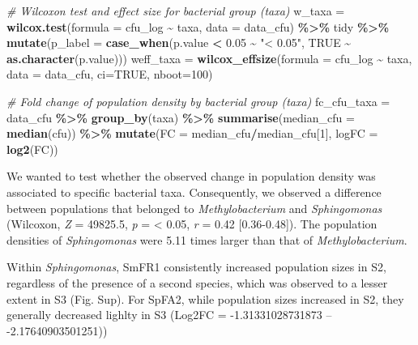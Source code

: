 \documentclass[
]{article}
\newenvironment{Shaded}{\begin{snugshade}}{\end{snugshade}}
\newcommand{\AttributeTok}[1]{\textcolor[rgb]{0.13,0.29,0.53}{#1}}
\newcommand{\CommentTok}[1]{\textcolor[rgb]{0.56,0.35,0.01}{\textit{#1}}}
\newcommand{\ConstantTok}[1]{\textcolor[rgb]{0.56,0.35,0.01}{#1}}
\newcommand{\DecValTok}[1]{\textcolor[rgb]{0.00,0.00,0.81}{#1}}
\newcommand{\FloatTok}[1]{\textcolor[rgb]{0.00,0.00,0.81}{#1}}
\newcommand{\FunctionTok}[1]{\textcolor[rgb]{0.13,0.29,0.53}{\textbf{#1}}}
\newcommand{\NormalTok}[1]{#1}
\newcommand{\OtherTok}[1]{\textcolor[rgb]{0.56,0.35,0.01}{#1}}
\newcommand{\SpecialCharTok}[1]{\textcolor[rgb]{0.81,0.36,0.00}{\textbf{#1}}}
\newcommand{\StringTok}[1]{\textcolor[rgb]{0.31,0.60,0.02}{#1}}
\begin{document}
\begin{Shaded}
\begin{Highlighting}[]
\CommentTok{\# Wilcoxon test and effect size for bacterial group (taxa)}
\NormalTok{w\_taxa }\OtherTok{=} \FunctionTok{wilcox.test}\NormalTok{(}\AttributeTok{formula =}\NormalTok{ cfu\_log }\SpecialCharTok{\textasciitilde{}}\NormalTok{ taxa, }\AttributeTok{data =}\NormalTok{ data\_cfu) }\SpecialCharTok{\%\textgreater{}\%}\NormalTok{ tidy }\SpecialCharTok{\%\textgreater{}\%} 
    \FunctionTok{mutate}\NormalTok{(}\AttributeTok{p\_label =} \FunctionTok{case\_when}\NormalTok{(p.value }\SpecialCharTok{\textless{}} \FloatTok{0.05} \SpecialCharTok{\textasciitilde{}} \StringTok{"\textless{} 0.05"}\NormalTok{, }\ConstantTok{TRUE} \SpecialCharTok{\textasciitilde{}} \FunctionTok{as.character}\NormalTok{(p.value)))}
\NormalTok{weff\_taxa }\OtherTok{=} \FunctionTok{wilcox\_effsize}\NormalTok{(}\AttributeTok{formula =}\NormalTok{ cfu\_log }\SpecialCharTok{\textasciitilde{}}\NormalTok{ taxa, }\AttributeTok{data =}\NormalTok{ data\_cfu, }\AttributeTok{ci=}\ConstantTok{TRUE}\NormalTok{, }\AttributeTok{nboot=}\DecValTok{100}\NormalTok{)}

\CommentTok{\# Fold change of population density by bacterial group (taxa)}
\NormalTok{fc\_cfu\_taxa }\OtherTok{=}\NormalTok{ data\_cfu }\SpecialCharTok{\%\textgreater{}\%} 
    \FunctionTok{group\_by}\NormalTok{(taxa) }\SpecialCharTok{\%\textgreater{}\%} 
    \FunctionTok{summarise}\NormalTok{(}\AttributeTok{median\_cfu =} \FunctionTok{median}\NormalTok{(cfu)) }\SpecialCharTok{\%\textgreater{}\%} 
    \FunctionTok{mutate}\NormalTok{(}\AttributeTok{FC =}\NormalTok{ median\_cfu}\SpecialCharTok{/}\NormalTok{median\_cfu[}\DecValTok{1}\NormalTok{],}
           \AttributeTok{logFC =} \FunctionTok{log2}\NormalTok{(FC))}
\end{Highlighting}
\end{Shaded}

We wanted to test whether the observed change in population density was
associated to specific bacterial taxa. Consequently, we observed a
difference between populations that belonged to \emph{Methylobacterium}
and \emph{Sphingomonas} (Wilcoxon, \emph{Z} = 49825.5, \emph{p} =
\textless{} 0.05, \emph{r} = 0.42 {[}0.36-0.48{]}). The population
densities of \emph{Sphingomonas} were 5.11 times larger than that of
\emph{Methylobacterium}.

Within \emph{Sphingomonas}, SmFR1 consistently increased population
sizes in S2, regardless of the presence of a second species, which was
observed to a lesser extent in S3 (Fig. Sup). For SpFA2, while
population sizes increased in S2, they generally decreased lighlty in S3
(Log2FC = -1.31331028731873 -- -2.17640903501251))
\end{document}
